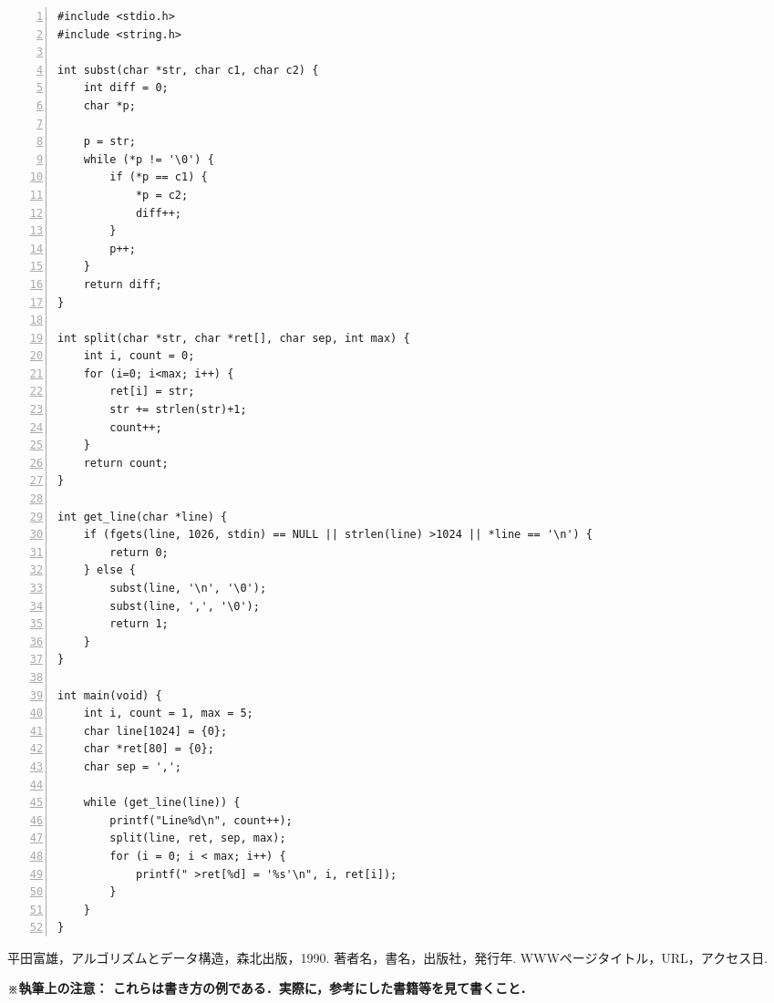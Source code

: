 \begin{Verbatim}[numbers=left, xleftmargin=10mm, numbersep=6pt,
  fontsize=\small, baselinestretch=0.8]
#include <stdio.h>
#include <string.h>

int subst(char *str, char c1, char c2) {
    int diff = 0;
    char *p;

    p = str;
    while (*p != '\0') {
        if (*p == c1) {
            *p = c2;
            diff++;
        }
        p++;
    }
    return diff;
}

int split(char *str, char *ret[], char sep, int max) {
    int i, count = 0;
    for (i=0; i<max; i++) {
        ret[i] = str;
        str += strlen(str)+1;
        count++;
    }
    return count;
}

int get_line(char *line) {
    if (fgets(line, 1026, stdin) == NULL || strlen(line) >1024 || *line == '\n') {
        return 0;
    } else {
        subst(line, '\n', '\0');
        subst(line, ',', '\0');
        return 1;
    }
}

int main(void) {
    int i, count = 1, max = 5;
    char line[1024] = {0};
    char *ret[80] = {0};
    char sep = ',';

    while (get_line(line)) {
        printf("Line%d\n", count++);
        split(line, ret, sep, max);
        for (i = 0; i < max; i++) {
            printf(" >ret[%d] = '%s'\n", i, ret[i]);
        }
    }
}

\end{Verbatim}


\begin{thebibliography}{99}
   平田富雄，アルゴリズムとデータ構造，森北出版，1990.
   著者名，書名，出版社，発行年.
   WWWページタイトル，URL，アクセス日.
\end{thebibliography}
\textbf{\small ※執筆上の注意：
      これらは書き方の例である．実際に，参考にした書籍等を見て書くこと．\\}



